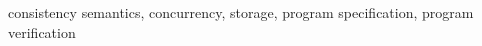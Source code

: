 \documentclass[journal, compsoc]{IEEEtran}
\begin{document}
{\begin{abstract}
	\end{abstract}
	
	
	\begin{IEEEkeywords}
		consistency semantics, concurrency, storage,  program specification, program verification
\end{IEEEkeywords}}
\end{document}

